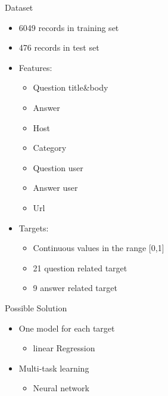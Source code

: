 \documentclass[
 size=12pt,
 paper=smartboard, %
 mode=present, %
 display=slides, %
style=tuliplab,
pauseslide,
fleqn,leqno]{powerdot}
\begin{document}
\begin{slide}{Dataset}
    \begin{itemize}
        \item 6049 records in training set
        \item 476 records in test set
        \item Features:
        \begin{itemize}
            \item Question title\&body
            \item Answer
            \item Host
            \item Category
            \item Question user
            \item Answer user
            \item Url
        \end{itemize}
        \item Targets:
        \begin{itemize}
            \item Continuous values in the range [0,1]
            \item 21 question related target
            \item 9 answer related target
        \end{itemize}
    \end{itemize}
\end{slide}
\begin{slide}{Possible Solution}
    \begin{itemize}
        \item One model for each target
        \begin{itemize}
            \item linear Regression
        \end{itemize}
        \item Multi-task learning
        \begin{itemize}
            \item Neural network
        \end{itemize}
    \end{itemize}
\end{slide}
\end{document}
